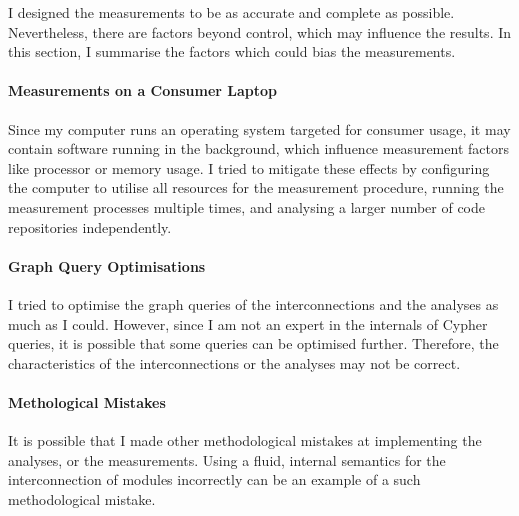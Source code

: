 I designed the measurements to be as accurate and complete as possible. Nevertheless, there are factors beyond control, which may influence the results. In this section, I summarise the factors which could bias the measurements.


\paragraph{Measurements on a Consumer Laptop}
Since my computer runs an operating system targeted for consumer usage, it may contain software running in the background, which influence measurement factors like processor or memory usage. I tried to mitigate these effects by configuring the computer to utilise all resources for the measurement procedure, running the measurement processes multiple times, and analysing a larger number of code repositories independently.


\paragraph{Graph Query Optimisations}
I tried to optimise the graph queries of the interconnections and the analyses as much as I could. However, since I am not an expert in the internals of Cypher queries, it is possible that some queries can be optimised further. Therefore, the characteristics of the interconnections or the analyses may not be correct.


\paragraph{Methological Mistakes}
It is possible that I made other methodological mistakes at implementing the analyses, or the measurements. Using a fluid, internal semantics for the interconnection of modules incorrectly can be an example of a such methodological mistake.